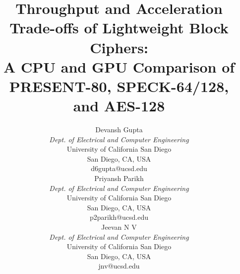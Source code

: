 \documentclass[conference]{IEEEtran}
\begin{document}
\title{Throughput and Acceleration Trade-offs of Lightweight Block Ciphers:\\
A CPU and GPU Comparison of PRESENT-80, SPECK-64/128, and AES-128}

\author{%
  \hfill\begin{minipage}[t]{0.30\textwidth}
    \centering
    Devansh Gupta\\
    \textit{Dept. of Electrical and Computer Engineering}\\
    University of California San Diego\\
    San Diego, CA, USA\\
    d6gupta@ucsd.edu
  \end{minipage}\hfill%
  \begin{minipage}[t]{0.30\textwidth}
    \centering
    Priyansh Parikh\\
    \textit{Dept. of Electrical and Computer Engineering}\\
    University of California San Diego\\
    San Diego, CA, USA\\
    p2parikh@ucsd.edu
  \end{minipage}\hfill%
  \begin{minipage}[t]{0.30\textwidth}
    \centering
    Jeevan N V\\
    \textit{Dept. of Electrical and Computer Engineering}\\
    University of California San Diego\\
    San Diego, CA, USA\\
    jnv@ucsd.edu
  \end{minipage}\hfill%
}

\maketitle
\end{document}
